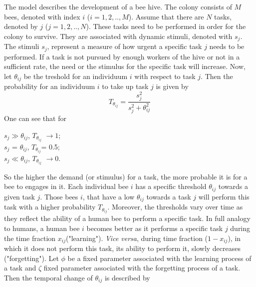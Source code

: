 
The model describes the development of a bee hive. The colony consists of $M$ bees, denoted with index $i$ ($i=1,2,..,M$). Assume that there are $N$ tasks, denoted by $j$ ($j=1,2,..,N$). These tasks need to be performed in order for the colony to survive. They are associated with dynamic stimuli, denoted with $s_{j}$. The stimuli $s_{j}$, represent a measure of how urgent a specific task $j$ needs to be performed. If a task is not pursued by enough workers of the hive or not in a sufficient rate, the need or the stimulus for the specific task will increase. Now, let $\theta_{ij}$ be the treshold for an individuum $i$ with respect to task $j$. Then the probability for an individuum $i$ to take up task $j$ is given by
\begin{equation} 
T_{\theta_{ij}}=\frac{s^{2}_{j}}{s^{2}_{j}+\theta^{2}_{ij}}
\end{equation}
One can see that for 
\begin{center}
$s_{j} \gg \theta_{ij}$, $T_{\theta_{ij}}$ $\to 1$; \\
$s_{j}$ = $\theta_{ij} $, $T_{\theta_{ij}}$= 0.5; \\
$s_{j} \ll \theta_{ij}$,  $T_{\theta_{ij}}$ $\to 0$.

\end{center}
 So the higher the demand (or stimulus) for a task, the more probable it is for a bee to engages in it. Each individual bee $i$ has a specific threshold $\theta_{ij}$ towards a given task $j$. Those bees $i$, that have a low $\theta_{ij}$ towards a task $j$ will perform this task with a higher probability $T_{\theta_{ij}}$. Moreover, the thresholds vary over time as they reflect the ability of a human bee to perform a specific task. In full analogy to humans, a human bee $i$ becomes better as it performs a specific task $j$ during the time fraction $x_{ij}$("learning"). \textit{Vice versa}, during time fraction ($1-x_{ij}$), in which it does not perform this task, its ability to perform it, slowly decreases ("forgetting"). Let $\phi$ be a fixed parameter associated with the learning process of a task and $\zeta$  fixed parameter associated with the forgetting process of a task. Then the temporal change of $\theta_{ij}$ is described by

